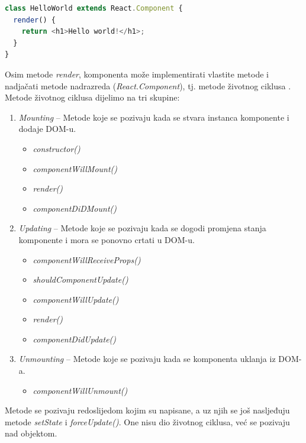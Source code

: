 \documentclass[times, utf8, zavrsni, numeric]{fer}
\newcommand{\razmakp}{\vspace{18pt}}
\newcommand{\razmaks}{\vspace{10pt}}
\begin{document}
\razmakp
\begin{lstlisting}[language=JavaScript, caption={Primjer komponente}, label={lst:component_example}]
class HelloWorld extends React.Component {
  render() {
    return <h1>Hello world!</h1>;
  }
}
\end{lstlisting}
\razmaks

Osim metode \emph{render}, komponenta može implementirati vlastite metode i nadjačati metode nadrazreda (\emph{React.Component}), tj. metode životnog ciklusa .
Metode životnog ciklusa dijelimo na tri skupine:
\begin{enumerate}
  \item \emph{Mounting} -- Metode koje se pozivaju kada se stvara instanca komponente i dodaje DOM-u.
  \begin{itemize}
    \item \emph{constructor()}
    \item \emph{componentWillMount()}
    \item \emph{render()}
    \item \emph{componentDiDMount()}
  \end{itemize}
  \item \emph{Updating} -- Metode koje se pozivaju kada se dogodi promjena stanja komponente i mora se ponovno crtati u DOM-u.
  \begin{itemize}
    \item \emph{componentWillReceiveProps()}
    \item \emph{shouldComponentUpdate()}
    \item \emph{componentWillUpdate()}
    \item \emph{render()}
    \item \emph{componentDidUpdate()}
  \end{itemize}
  \item \emph{Unmounting} -- Metode koje se pozivaju kada se komponenta uklanja iz DOM-a.
  \begin{itemize}
    \item \emph{componentWillUnmount()}
  \end{itemize}
\end{enumerate}
\razmaks

Metode se pozivaju redoslijedom kojim su napisane, a uz njih se još nasljeđuju metode \emph{setState}
i \emph{forceUpdate()}.
One nisu dio životnog ciklusa, već se pozivaju nad objektom.
\end{document}

